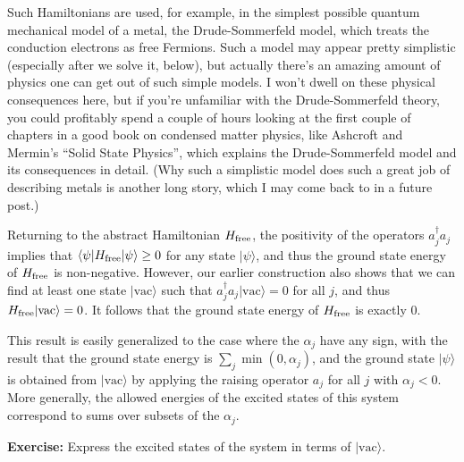 \documentclass[12pt]{article}
\begin{document}
Such Hamiltonians are used, for example, in the simplest possible
quantum mechanical model of a metal, the Drude-Sommerfeld model, which
treats the conduction electrons as free Fermions.  Such a model may
appear pretty simplistic (especially after we solve it, below), but
actually there's an amazing amount of physics one can get out of such
simple models.  I won't dwell on these physical consequences here, but
if you're unfamiliar with the Drude-Sommerfeld theory, you could
profitably spend a couple of hours looking at the first couple of
chapters in a good book on condensed matter physics, like Ashcroft and
Mermin's ``Solid State Physics'', which explains the Drude-Sommerfeld
model and its consequences in detail.  (Why such a simplistic model
does such a great job of describing metals is another long story,
which I may come back to in a future post.)

Returning to the abstract Hamiltonian $H_{\rm free}$, the positivity
of the operators $a_j^\dagger a_j$ implies that $\langle \psi |H_{\rm
  free} |\psi\rangle \geq 0$ for any state $|\psi\rangle$, and thus
the ground state energy of $H_{\rm free}$ is non-negative.  However,
our earlier construction also shows that we can find at least one
state $|\mbox{vac}\rangle$ such that $a_j^\dagger
a_j|\mbox{vac}\rangle = 0$ for all $j$, and thus $H_{\rm
  free}|\mbox{vac}\rangle = 0$.  It follows that the ground state
energy of $H_{\rm free}$ is exactly $0$.

This result is easily generalized to the case where the $\alpha_j$
have any sign, with the result that the ground state energy is $\sum_j
\min(0,\alpha_j)$, and the ground state $|\psi\rangle$ is obtained
from $|\mbox{vac}\rangle$ by applying the raising operator $a_j$ for
all $j$ with $\alpha_j < 0$. More generally, the allowed energies of
the excited states of this system correspond to sums over subsets of
the $\alpha_j$.

\textbf{Exercise:} Express the excited states of the system in terms
of $|\mbox{vac}\rangle$.
\end{document}
